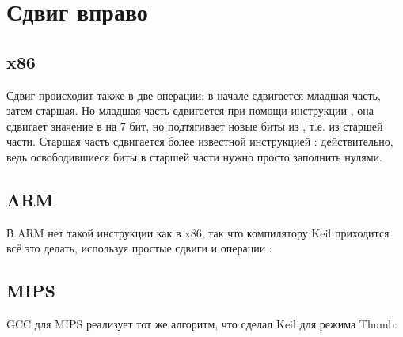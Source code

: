 ﻿\section{Сдвиг вправо}



\subsection{x86}





Сдвиг происходит также в две операции: в начале сдвигается младшая часть, затем старшая.
Но младшая часть сдвигается при помощи инструкции , она сдвигает значение в \EDX{} на 7 бит, но подтягивает новые биты из \EAX{}, т.е. из старшей части.
Старшая часть сдвигается более известной инструкцией \SHR{}: действительно, ведь освободившиеся биты в старшей части нужно
просто заполнить нулями.

\subsection{ARM}

В ARM нет такой инструкции как  в x86, так что компилятору Keil приходится всё это делать,
используя простые сдвиги и операции :





\subsection{MIPS}

GCC для MIPS реализует тот же алгоритм, что сделал Keil для режима Thumb:




